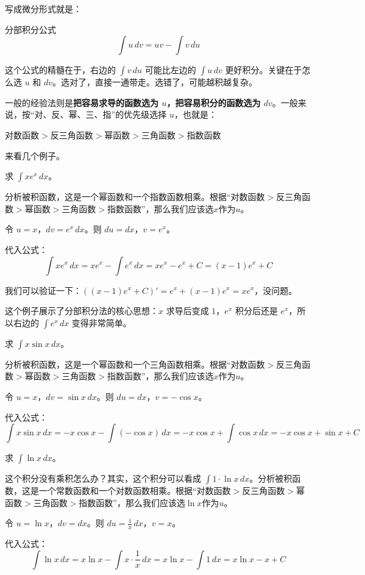 写成微分形式就是：

\begin{theorem}{分部积分公式}{}
\[
\int u\, dv = uv - \int v\, du
\]
\end{theorem}

这个公式的精髓在于，右边的 $\int v\, du$ 可能比左边的 $\int u\, dv$ 更好积分。关键在于怎么选 $u$ 和 $dv$。选对了，直接一通带走。选错了，可能越积越复杂。

一般的经验法则是\textbf{把容易求导的函数选为 $u$，把容易积分的函数选为 $dv$}。一般来说，按“对、反、幂、三、指”的优先级选择 $u$，也就是：
\begin{center}
  对数函数$>$反三角函数$>$幂函数$>$三角函数$>$指数函数
\end{center}



来看几个例子。

\begin{myexample}
  求 $\int x e^x\, dx$。

  分析被积函数，这是一个幂函数和一个指数函数相乘。根据“对数函数$>$反三角函数$>$幂函数$>$三角函数$>$指数函数”，那么我们应该选$x$作为$u$。

  令 $u = x$，$dv = e^x\, dx$。则 $du = dx$，$v = e^x$。
  
  代入公式：
  \[
  \int x e^x\, dx = x e^x - \int e^x\, dx = x e^x - e^x + C = (x-1)e^x + C
  \]

\end{myexample}

我们可以验证一下：$((x-1)e^x + C)' = e^x + (x-1)e^x = x e^x$，没问题。

这个例子展示了分部积分法的核心思想：$x$ 求导后变成 $1$，$e^x$ 积分后还是 $e^x$，所以右边的 $\int e^x\,dx$ 变得非常简单。

\begin{myexample}
  求 $\int x \sin x\, dx$。

  分析被积函数，这是一个幂函数和一个三角函数相乘。根据“对数函数$>$反三角函数$>$幂函数$>$三角函数$>$指数函数”，那么我们应该选$x$作为$u$。

  令 $u = x$，$dv = \sin x\, dx$。则 $du = dx$，$v = -\cos x$。
  
  代入公式：
  \[
  \int x \sin x\, dx = -x\cos x - \int (-\cos x)\, dx = -x\cos x + \int \cos x\, dx = -x\cos x + \sin x + C
  \]
\end{myexample}

\begin{myexample}
  求 $\int \ln x\, dx$。

  这个积分没有乘积怎么办？其实，这个积分可以看成 $\int 1 \cdot \ln x\, dx$。分析被积函数，这是一个常数函数和一个对数函数相乘。根据“对数函数$>$反三角函数$>$幂函数$>$三角函数$>$指数函数”，那么我们应该选$\ln x$作为$u$。
  
  令 $u = \ln x$，$dv = dx$。则 $du = \frac{1}{x}\, dx$，$v = x$。
  
  代入公式：
  \[
  \int \ln x\, dx = x\ln x - \int x \cdot \frac{1}{x}\, dx = x\ln x - \int 1\, dx = x\ln x - x + C
  \]

\end{myexample}

